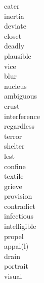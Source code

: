 \documentclass[a4paper, 10pt]{ctexart}
\begin{document}
\begin{multicols*}{2}
\begin{description}
\item[cater]

\item[inertia]

\item[deviate]

\item[closet]

\item[deadly]

\item[plausible]

\item[vice]

\item[blur]

\item[nucleus]

\item[ambiguous]

\item[crust]

\item[interference]

\item[regardless]

\item[terror]

\item[shelter]

\item[lest]

\item[confine]

\item[textile]

\item[grieve]

\item[provision]

\item[contradict]

\item[infectious]

\item[intelligible]

\item[propel]

\item[appal(l)]

\item[drain]

\item[portrait]

\item[visual]


\end{description}
\end{multicols*}
\end{document}
